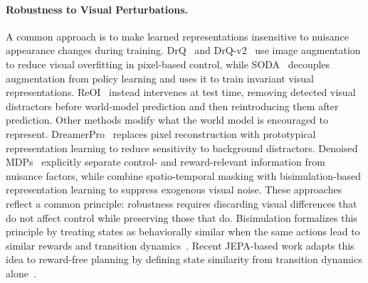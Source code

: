 \documentclass{article}
\begin{document}
\paragraph{Robustness to Visual Perturbations.}
A common approach is to make learned representations insensitive to nuisance
appearance changes during training. DrQ~\citep{kostrikov2020drq} and
DrQ-v2~\citep{yarats2022drqv2} use image augmentation to reduce visual
overfitting in pixel-based control, while SODA~\citep{hansen2021soda}
decouples augmentation from policy learning and uses it to train invariant
visual representations. ReOI~\citep{chen2025reoi} instead intervenes at test
time, removing detected visual distractors before world-model prediction and
then reintroducing them after prediction.
Other methods modify what the world model is encouraged to represent.
DreamerPro~\citep{deng2022dreamerpro} replaces pixel reconstruction with
prototypical representation learning to reduce sensitivity to background
distractors. Denoised MDPs~\citep{wang2022denoisedmdps} explicitly separate
control- and reward-relevant information from nuisance factors, while
\citet{sun2024latentrobustwm} combine spatio-temporal masking with
bisimulation-based representation learning to suppress exogenous visual noise.
These approaches reflect a common principle: robustness requires discarding
visual differences that do not affect control while preserving those that do.
Bisimulation formalizes this principle by treating states as behaviorally
similar when the same actions lead to similar rewards and transition
dynamics~\citep{gelada2019deepmdp,zhang2021dbc,bsmpc}. Recent JEPA-based work
adapts this idea to reward-free planning by defining state similarity from
transition dynamics alone~\citep{toso2026bisimjepa}.
\end{document}
